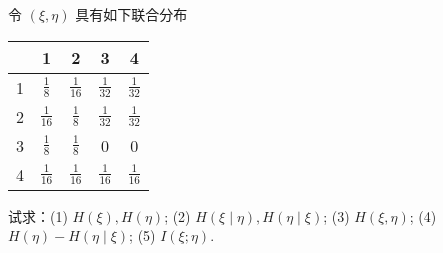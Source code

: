 \begin{tcolorbox}[breakable,colback=blue!5!white,colframe=blue!75!black,
 title= 解答题]
 令 $ (\xi, \eta) $ 具有如下联合分布
\begin{tabular}{|c|cccc|}
\hline\diagbox{$ \eta $}{$ \xi $} & 1 & 2 & 3 & 4 \\
\hline 1 & $ \frac{1}{8} $ & $ \frac{1}{16} $ & $ \frac{1}{32} $ & $ \frac{1}{32} $ \\
2 & $ \frac{1}{16} $ & $ \frac{1}{8} $ & $ \frac{1}{32} $ & $ \frac{1}{32} $ \\
3 & $ \frac{1}{8} $ & $ \frac{1}{8} $ & 0 & 0 \\
4 & $ \frac{1}{16} $ & $ \frac{1}{16} $ & $ \frac{1}{16} $ & $ \frac{1}{16} $ \\
\hline
\end{tabular}

试求：(1) $ H(\xi), H(\eta) $; (2) $ H(\xi \mid \eta), H(\eta \mid \xi) $; (3) $ H(\xi, \eta) $;
(4) $ H(\eta)-H(\eta \mid \xi) $; (5) $ I(\xi ; \eta) $.

\tcblower


\end{tcolorbox}
